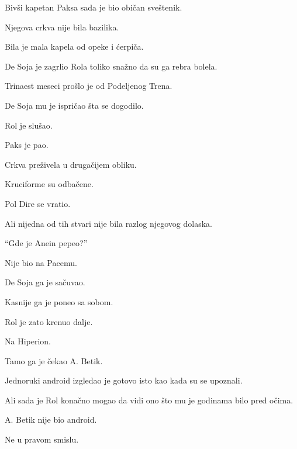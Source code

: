 Bivši kapetan Paksa sada je bio običan sveštenik.

\bigskip

Njegova crkva nije bila bazilika.

Bila je mala kapela od opeke i ćerpiča.

\bigskip

De Soja je zagrlio Rola toliko snažno da su ga rebra bolela.

\bigskip

Trinaest meseci prošlo je od Podeljenog Trena.

\bigskip

De Soja mu je ispričao šta se dogodilo.

\bigskip

Rol je slušao.

Paks je pao.

Crkva preživela u drugačijem obliku.

Kruciforme su odbačene.

Pol Dire se vratio.

\bigskip

Ali nijedna od tih stvari nije bila razlog njegovog dolaska.

\bigskip

``Gde je Anein pepeo?''

\bigskip

Nije bio na Pacemu.

\bigskip

De Soja ga je sačuvao.

\bigskip

Kasnije ga je poneo sa sobom.

\bigskip

Rol je zato krenuo dalje.

\bigskip

Na Hiperion.

\bigskip

Tamo ga je čekao A. Betik.

\bigskip

Jednoruki android izgledao je gotovo isto kao kada su se upoznali.

\bigskip

Ali sada je Rol konačno mogao da vidi ono što mu je godinama bilo pred očima.

\bigskip

A. Betik nije bio android.

\bigskip

Ne u pravom smislu.

\bigskip

